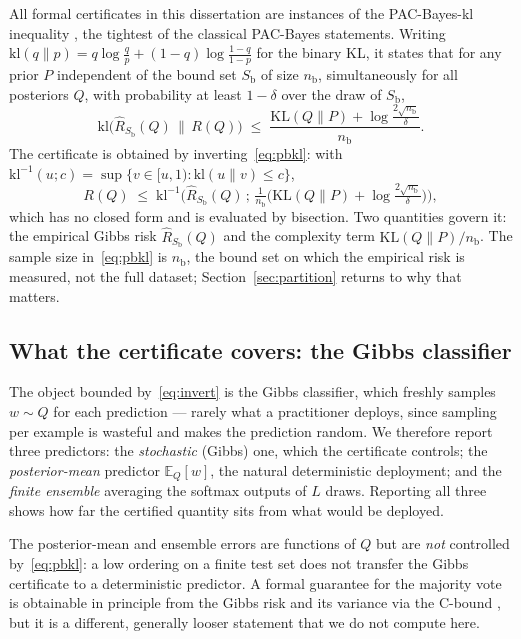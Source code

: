 All formal certificates in this dissertation are instances of the
PAC-Bayes-kl inequality \parencite{maurer2004,seeger2002}, the tightest of the
classical PAC-Bayes statements. Writing
$\mathrm{kl}(q\|p)=q\log\frac{q}{p}+(1-q)\log\frac{1-q}{1-p}$ for the binary KL,
it states that for any prior $P$ independent of the bound set $S_{\mathrm b}$ of
size $n_{\mathrm b}$, simultaneously for all posteriors $Q$, with probability at
least $1-\delta$ over the draw of $S_{\mathrm b}$,
\begin{equation}\label{eq:pbkl}
\mathrm{kl}\!\big(\hat{R}_{S_{\mathrm b}}(Q)\,\big\|\,R(Q)\big)\;\le\;
\frac{\mathrm{KL}(Q\|P)+\log\frac{2\sqrt{n_{\mathrm b}}}{\delta}}{n_{\mathrm b}}.
\end{equation}
The certificate is obtained by inverting~\eqref{eq:pbkl}: with
$\mathrm{kl}^{-1}(u;c)=\sup\{v\in[u,1):\mathrm{kl}(u\|v)\le c\}$,
\begin{equation}\label{eq:invert}
R(Q)\;\le\;\mathrm{kl}^{-1}\!\Big(\hat{R}_{S_{\mathrm b}}(Q)\,;\,
\tfrac{1}{n_{\mathrm b}}\big(\mathrm{KL}(Q\|P)+\log\tfrac{2\sqrt{n_{\mathrm b}}}{\delta}\big)\Big),
\end{equation}
which has no closed form and is evaluated by bisection. Two quantities govern it:
the empirical Gibbs risk $\hat{R}_{S_{\mathrm b}}(Q)$ and the complexity term
$\mathrm{KL}(Q\|P)/n_{\mathrm b}$. The sample size in~\eqref{eq:pbkl} is
$n_{\mathrm b}$, the bound set on which the empirical risk is measured, not the
full dataset; Section~\ref{sec:partition} returns to why that matters.

\subsection{What the certificate covers: the Gibbs classifier}\label{sec:scope}

The object bounded by~\eqref{eq:invert} is the Gibbs classifier, which freshly
samples $w\sim Q$ for each prediction --- rarely what a practitioner deploys,
since sampling per example is wasteful and makes the prediction random. We
therefore report three predictors: the \emph{stochastic} (Gibbs) one, which the
certificate controls; the \emph{posterior-mean} predictor $\mathbb{E}_Q[w]$, the
natural deterministic deployment; and the \emph{finite ensemble} averaging the
softmax outputs of $L$ draws. Reporting all three shows how far the certified
quantity sits from what would be deployed.

The posterior-mean and ensemble errors are functions of $Q$ but are \emph{not}
controlled by~\eqref{eq:pbkl}: a low ordering on a finite test set does
not transfer the Gibbs certificate to a deterministic predictor. A formal
guarantee for the majority vote is obtainable in principle from the Gibbs risk
and its variance via the C-bound \parencite{lacasse2006,germain2015}, but it is a
different, generally looser statement that we do not compute here.

